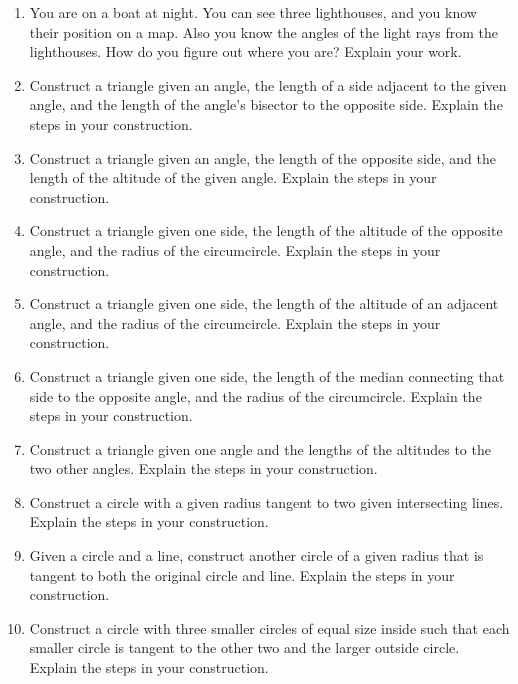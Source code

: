 \begin{problems}
\begin{enumerate}
\item You are on a boat at night. You can see three lighthouses, and
  you know their position on a map.  Also you know the angles of the
  light rays from the lighthouses.  How do you figure out where you
  are? Explain your work.

\item Construct a triangle given an angle, the length of a side
  adjacent to the given angle, and the length of the angle's bisector
  to the opposite side. Explain the steps in your construction.

\item Construct a triangle given an angle, the length of the opposite
  side, and the length of the altitude of the given angle. Explain the
  steps in your construction.

\item Construct a triangle given one side, the length of the altitude
  of the opposite angle, and the radius of the circumcircle. Explain
  the steps in your construction.

\item Construct a triangle given one side, the length of the altitude
  of an adjacent angle, and the radius of the circumcircle. Explain
  the steps in your construction.

\item Construct a triangle given one side, the length of the median
  connecting that side to the opposite angle, and the radius of the
  circumcircle. Explain the steps in your construction.  

\item Construct a triangle given one angle and the lengths of the
  altitudes to the two other angles. Explain the steps in your
  construction.

\item Construct a circle with a given radius tangent to two given
  intersecting lines. Explain the steps in your construction.

\item Given a circle and a line, construct another circle of a given
  radius that is tangent to both the original circle and line. Explain
  the steps in your construction.

\item Construct a circle with three smaller circles of equal size
  inside such that each smaller circle is tangent to the other two and
  the larger outside circle. Explain the steps in your construction.

\end{enumerate}
\end{problems}
